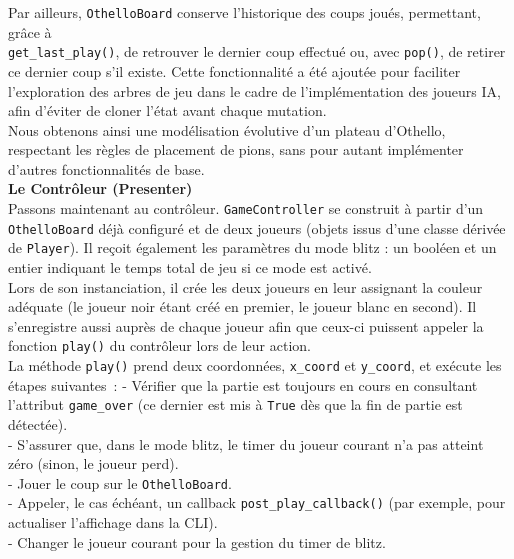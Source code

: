 \documentclass[a4paper,12pt]{article}
\begin{document}
\newpage

Par ailleurs, \texttt{OthelloBoard} conserve l’historique des coups joués,
permettant, grâce à\\ \texttt{get\_last\_play()}, de retrouver le dernier coup
effectué ou, avec \texttt{pop()}, de retirer ce dernier coup s'il existe. Cette
fonctionnalité a été ajoutée pour faciliter l’exploration des arbres de jeu
dans le cadre de l’implémentation des joueurs IA, afin d’éviter de cloner
l’état avant chaque mutation.\\

Nous obtenons ainsi une modélisation évolutive d’un plateau d’Othello,
respectant les règles de placement de pions, sans pour autant implémenter
d’autres fonctionnalités de base.\\

\textbf{Le Contrôleur (Presenter)}\\

Passons maintenant au contrôleur. \texttt{GameController} se construit à partir
d’un \texttt{OthelloBoard} déjà configuré et de deux joueurs (objets issus
d’une classe dérivée de \texttt{Player}). Il reçoit également les paramètres du
mode blitz : un booléen et un entier indiquant le temps total de jeu si ce mode
est activé.\\ Lors de son instanciation, il crée les deux joueurs en leur
assignant la couleur adéquate (le joueur noir étant créé en premier, le joueur
blanc en second). Il s’enregistre aussi auprès de chaque joueur afin que
ceux-ci puissent appeler la fonction \texttt{play()} du contrôleur lors de leur
action.\\

La méthode \texttt{play()} prend deux coordonnées, \texttt{x\_coord} et
\texttt{y\_coord}, et exécute les étapes suivantes~: - Vérifier que la partie
est toujours en cours en consultant l’attribut \texttt{game\_over} (ce dernier
est mis à \texttt{True} dès que la fin de partie est détectée).\\ - S’assurer
que, dans le mode blitz, le timer du joueur courant n’a pas atteint zéro
(sinon, le joueur perd).\\ - Jouer le coup sur le \texttt{OthelloBoard}.\\ -
Appeler, le cas échéant, un callback \texttt{post\_play\_callback()} (par
exemple, pour actualiser l’affichage dans la CLI).\\ - Changer le joueur
courant pour la gestion du timer de blitz.\\
\end{document}
